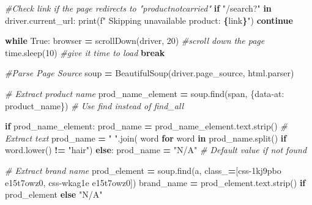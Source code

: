 \documentclass[
]{article}
\newenvironment{Shaded}{\begin{snugshade}}{\end{snugshade}}
\newcommand{\BuiltInTok}[1]{#1}
\newcommand{\CommentTok}[1]{\textcolor[rgb]{0.56,0.35,0.01}{\textit{#1}}}
\newcommand{\ControlFlowTok}[1]{\textcolor[rgb]{0.13,0.29,0.53}{\textbf{#1}}}
\newcommand{\DecValTok}[1]{\textcolor[rgb]{0.00,0.00,0.81}{#1}}
\newcommand{\KeywordTok}[1]{\textcolor[rgb]{0.13,0.29,0.53}{\textbf{#1}}}
\newcommand{\NormalTok}[1]{#1}
\newcommand{\OperatorTok}[1]{\textcolor[rgb]{0.81,0.36,0.00}{\textbf{#1}}}
\newcommand{\SpecialCharTok}[1]{\textcolor[rgb]{0.81,0.36,0.00}{\textbf{#1}}}
\newcommand{\SpecialStringTok}[1]{\textcolor[rgb]{0.31,0.60,0.02}{#1}}
\newcommand{\StringTok}[1]{\textcolor[rgb]{0.31,0.60,0.02}{#1}}
\newcommand{\VariableTok}[1]{\textcolor[rgb]{0.00,0.00,0.00}{#1}}
\begin{document}
\begin{Shaded}
\begin{Highlighting}[]
        \CommentTok{\#Check link if the page redirects to "productnotcarried"}
        \ControlFlowTok{if} \StringTok{"/search?"} \KeywordTok{in}\NormalTok{ driver.current\_url:}
          \BuiltInTok{print}\NormalTok{(}\SpecialStringTok{f" Skipping unavailable product: }\SpecialCharTok{\{}\NormalTok{link}\SpecialCharTok{\}}\SpecialStringTok{"}\NormalTok{)}
          \ControlFlowTok{continue}
        
        \ControlFlowTok{while} \VariableTok{True}\NormalTok{:}
\NormalTok{            browser }\OperatorTok{=}\NormalTok{ scrollDown(driver, }\DecValTok{20}\NormalTok{) }\CommentTok{\#scroll down the page}
\NormalTok{            time.sleep(}\DecValTok{10}\NormalTok{) }\CommentTok{\#give it time to load}
            \ControlFlowTok{break}
        
        \CommentTok{\#Parse Page Source}
\NormalTok{        soup }\OperatorTok{=}\NormalTok{ BeautifulSoup(driver.page\_source, }\StringTok{\textquotesingle{}html.parser\textquotesingle{}}\NormalTok{)}
        
        \CommentTok{\# Extract product name}
\NormalTok{        prod\_name\_element }\OperatorTok{=}\NormalTok{ soup.find(}\StringTok{\textquotesingle{}span\textquotesingle{}}\NormalTok{, \{}\StringTok{\textquotesingle{}data{-}at\textquotesingle{}}\NormalTok{: }
          \StringTok{\textquotesingle{}product\_name\textquotesingle{}}\NormalTok{\})  }\CommentTok{\# Use find instead of find\_all}

        \ControlFlowTok{if}\NormalTok{ prod\_name\_element:}
\NormalTok{          prod\_name }\OperatorTok{=}\NormalTok{ prod\_name\_element.text.strip()  }\CommentTok{\# Extract text}
\NormalTok{          prod\_name }\OperatorTok{=} \StringTok{" "}\NormalTok{.join(}
\NormalTok{            word }\ControlFlowTok{for}\NormalTok{ word }\KeywordTok{in}\NormalTok{ prod\_name.split() }\ControlFlowTok{if}\NormalTok{ word.lower() }\OperatorTok{!=} \StringTok{"hair"}\NormalTok{)}
        \ControlFlowTok{else}\NormalTok{:}
\NormalTok{          prod\_name }\OperatorTok{=} \StringTok{"N/A"}  \CommentTok{\# Default value if not found}

        \CommentTok{\# Extract brand name}
\NormalTok{        prod\_element }\OperatorTok{=}\NormalTok{ soup.find(}\StringTok{\textquotesingle{}a\textquotesingle{}}\NormalTok{, class\_}\OperatorTok{=}\NormalTok{[}\StringTok{\textquotesingle{}css{-}1kj9pbo e15t7owz0\textquotesingle{}}\NormalTok{,}
                                            \StringTok{\textquotesingle{}css{-}wkag1e e15t7owz0\textquotesingle{}}\NormalTok{])}
\NormalTok{        brand\_name }\OperatorTok{=}\NormalTok{ prod\_element.text.strip() }\ControlFlowTok{if}\NormalTok{ prod\_element }\ControlFlowTok{else} \StringTok{"N/A"}


\end{Highlighting}
\end{Shaded}
\end{document}
